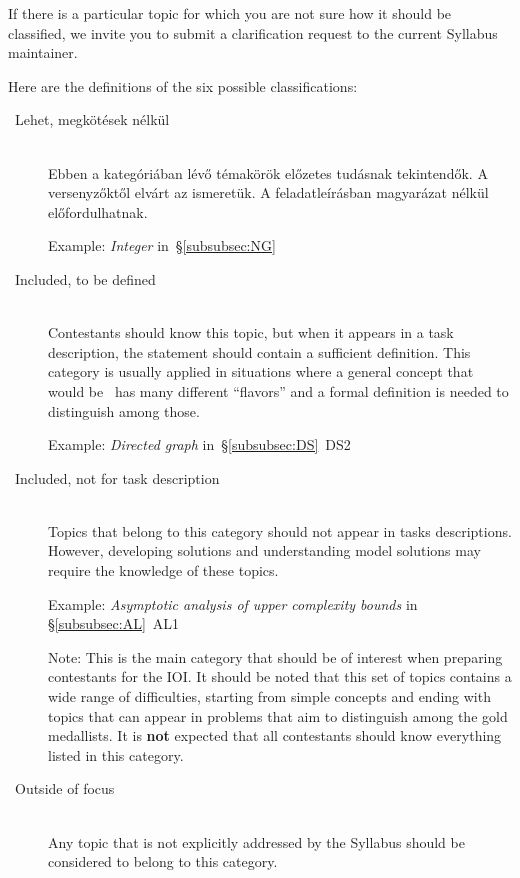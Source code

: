 \documentclass[a4paper,11pt,oneside]{article}
\newcommand{\cmark}{\ding{51}}%
\newcommand{\cincl}{{\small\cmark}}
\newcommand{\cdefi}{{\small\cmark\faFileTextO}}
\newcommand{\ccode}{{\small\cmark\faFileText}}
\newcommand{\cnfoc}{{\small\faQuestion}}
\begin{document}
If there is a particular topic for which you are not sure how it should
be classified, we invite you to submit a clarification request to the 
current Syllabus maintainer.

\bigskip

\noindent
Here are the definitions of the six possible classifications:

\begin{description}
\item[\cincl\ Lehet, megkötések nélkül]~\\
    Ebben a kategóriában lévő témakörök előzetes tudásnak tekintendők. A versenyzőktől elvárt az ismeretük.
    A feladatleírásban magyarázat nélkül előfordulhatnak.

    Example: \emph{Integer} in~\S\ref{subsubsec:NG}

\item[\cdefi\ Included, to be defined]~\\
    Contestants should know this topic,
    but when it appears in a task description,
    the statement should contain a sufficient definition.
    This category is usually applied in situations where a general
    concept that would be \cincl\ has many different ``flavors'' and a formal definition
    is needed to distinguish among those.

    Example: \emph{Directed graph} in~\S\ref{subsubsec:DS}~DS2

\item[\ccode\ Included, not for task description]~\\
    Topics that belong to this category should not appear in tasks 
    descriptions. However, developing solutions and understanding 
    model solutions may require the knowledge of these topics.

    Example: \emph{Asymptotic analysis of upper complexity bounds\/}
    in \S\ref{subsubsec:AL}~AL1

    Note: This is the main category that should be of interest when 
    preparing contestants for the IOI. 
    It should be noted that this set of topics
    contains a wide range of difficulties, starting from simple concepts and ending 
    with topics that can appear in problems that aim to distinguish among 
    the gold medallists. It is \textbf{not} expected that all contestants
    should know everything listed in this category.

\item[\cnfoc\ Outside of focus]~\\
    Any topic that is not explicitly addressed by the Syllabus
    should be considered to belong to this category.


\end{description}
\end{document}
